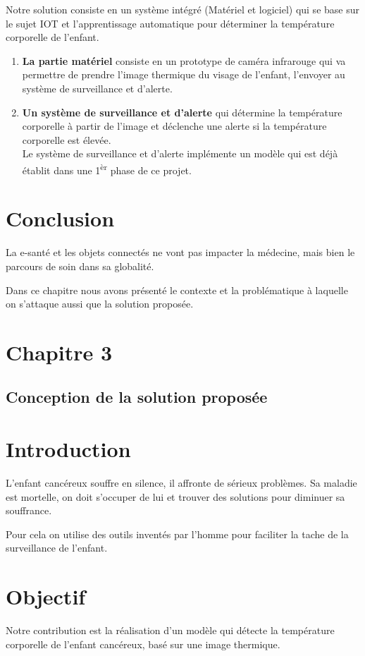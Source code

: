 \documentclass[12pt]{article}
\begin{document}
Notre solution consiste en un système intégré (Matériel et logiciel) qui se base sur le sujet IOT et l'apprentissage automatique pour déterminer la température corporelle de l'enfant.
\begin{enumerate}
	\item \textbf{La partie matériel} consiste en un prototype de caméra infrarouge qui va permettre de prendre l'image thermique du visage de l'enfant, l'envoyer au système de surveillance et  d'alerte.
	\item \textbf{Un système de surveillance et d'alerte} qui détermine la température corporelle à partir de l'image et déclenche une alerte si la température corporelle est élevée.\\
	Le système de surveillance et d'alerte implémente un modèle qui est déjà établit dans une 1\textsuperscript{èr} phase de ce projet.
\end{enumerate}

\section{Conclusion}
La e-santé et les objets connectés ne vont pas impacter  la médecine, mais bien le parcours de soin dans sa globalité.

Dans ce chapitre nous avons présenté le contexte et la problématique à laquelle on s'attaque aussi que la solution proposée.

\newpage
\rhead{}
\section*{\Huge{Chapitre 3}}
\subsection*{\huge{Conception de la solution proposée}}
\newpage
{}
\section{Introduction}
L'enfant cancéreux souffre en silence, il affronte de sérieux problèmes. Sa maladie est mortelle, on doit s’occuper de lui et trouver des solutions pour diminuer sa souffrance.

Pour cela on utilise des outils inventés par l'homme pour faciliter la tache de la surveillance de l'enfant.
\section{Objectif}
Notre contribution est la réalisation d'un modèle %
qui détecte la température corporelle de l'enfant cancéreux, basé sur une image thermique.
\end{document}
